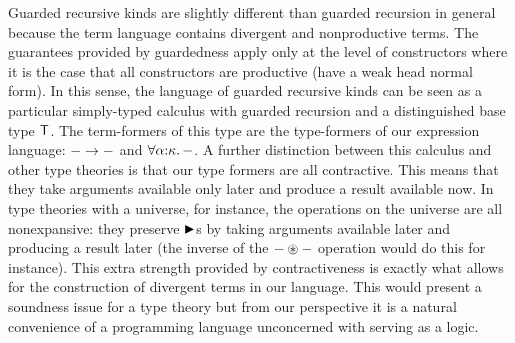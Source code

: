 Guarded recursive kinds are slightly different than guarded recursion
in general because the term language contains divergent and
nonproductive terms. The guarantees provided by guardedness apply only
at the level of constructors where it is the case that all
constructors are productive (have a weak head normal form). In this
sense, the language of guarded recursive kinds can be seen as a
particular simply-typed calculus with guarded recursion and a
distinguished base type $\mathsf{T}$. The term-formers of this type are the
type-formers of our expression language: $- \to -$ and
$\forall \alpha {:} \kappa.\, -$. A further distinction between this calculus
and other type theories is that our type formers are all
contractive. This means that they take arguments available only later
and produce a result available now. In type theories with a universe,
for instance, the operations on the universe are all nonexpansive:
they preserve ${\blacktriangleright}$s by taking arguments available later and producing
a result later (the inverse of the $- \circledast -$ operation would do this
for instance). This extra strength provided by contractiveness is
exactly what allows for the construction of divergent terms in our
language. This would present a soundness issue for a type theory but
from our perspective it is a natural convenience of a programming
language unconcerned with serving as a logic.

